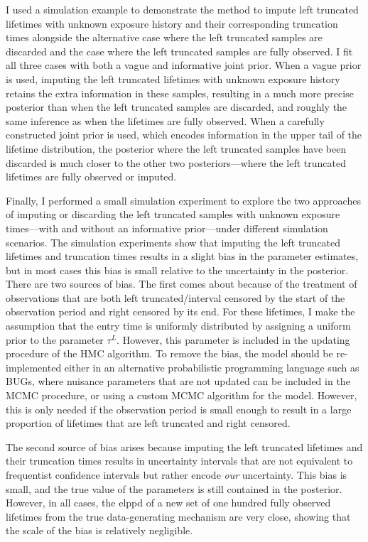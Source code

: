 I used a simulation example to demonstrate the method to impute left truncated lifetimes with unknown exposure history and their corresponding truncation times alongside the alternative case where the left truncated samples are discarded and the case where the left truncated samples are fully observed. I fit all three cases with both a vague and informative joint prior. When a vague prior is used, imputing the left truncated lifetimes with unknown exposure history retains the extra information in these samples, resulting in a much more precise posterior than when the left truncated samples are discarded, and roughly the same inference as when the lifetimes are fully observed. When a carefully constructed joint prior is used, which encodes information in the upper tail of the lifetime distribution, the posterior where the left truncated samples have been discarded is much closer to the other two posteriors---where the left truncated lifetimes are fully observed or imputed.

Finally, I performed a small simulation experiment to explore the two approaches of imputing or discarding the left truncated samples with unknown exposure times---with and without an informative prior---under different simulation scenarios. The simulation experiments show that imputing the left truncated lifetimes and truncation times results in a slight bias in the parameter estimates, but in most cases this bias is small relative to the uncertainty in the posterior. There are two sources of bias. The first comes about because of the treatment of observations that are both left truncated/interval censored by the start of the observation period and right censored by its end. For these lifetimes, I make the assumption that the entry time is uniformly distributed by assigning a uniform prior to the parameter $\tau^L$. However, this parameter is included in the updating procedure of the HMC algorithm. To remove the bias, the model should be re-implemented either in an alternative probabilistic programming language such as BUGs, where nuisance parameters that are not updated can be included in the MCMC procedure, or using a custom MCMC algorithm for the model. However, this is only needed if the observation period is small enough to result in a large proportion of lifetimes that are left truncated and right censored.

The second source of bias arises because imputing the left truncated lifetimes and their truncation times results in uncertainty intervals that are not equivalent to frequentist confidence intervals but rather encode \textit{our} uncertainty. This bias is small, and the true value of the parameters is still contained in the posterior. However, in all cases, the elppd of a new set of one hundred fully observed lifetimes from the true data-generating mechanism are very close, showing that the scale of the bias is relatively negligible.

